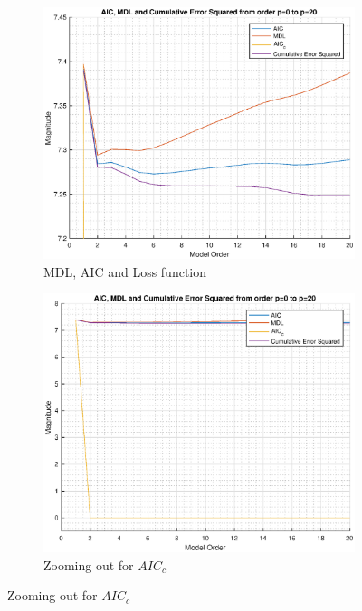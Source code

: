 \begin{figure}[h!]
\centering
\begin{subfigure}{0.32\textwidth}
\centering
\includegraphics[width = \textwidth]{heart_mdl_t2_zoom}
\caption{MDL, AIC and Loss function}
\label{fig:heart_mdl_t2_zoom}
\end{subfigure}
\begin{subfigure}{0.32\textwidth}
\centering
\includegraphics[width = \textwidth]{heart_mdl_t2}
\caption{Zooming out for $AIC_c$}
\label{fig:heart_mdl_t2}
\end{subfigure}

\end{figure}
